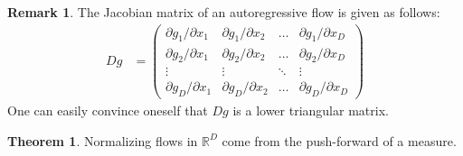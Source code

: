 \documentclass[12pt, a4paper]{article}
\numberwithin{equation}{section}
\theoremstyle{definition}
\theoremstyle{definition}
\newtheorem{remark}[thm]{Remark} %
\newtheorem{theorem}[thm]{Theorem}
\begin{document}
	\begin{remark}
		The Jacobian matrix of an autoregressive flow is given as follows: 
		\begin{align}
			Dg &= \begin{pmatrix}
				\partial g_1/\partial x_1 & \partial g_1/\partial x_2 & \dots & \partial g_1/\partial x_D 
								\\ 
				\partial g_2/\partial x_1 & \partial g_2/\partial x_2 & \dots & \partial g_2/\partial x_D
								\\
				\vdots & \vdots & \ddots & \vdots 
								\\ 
				\partial g_D/\partial x_1 & \partial g_D / \partial x_2 & \dots & \partial g_D / \partial x_D
			\end{pmatrix} 
		\end{align}
	One can easily convince oneself that $Dg$ is a lower triangular matrix. 
	\end{remark}

	\begin{theorem}
		Normalizing flows in $\mathbb{R}^D$ come from the push-forward of a measure. 
	\end{theorem}
	
\end{document}
